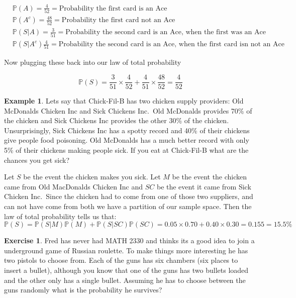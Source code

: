 \documentclass[
]{book}
\newcommand{\prob}[1]{{\mathbb{P}(#1)}}
\theoremstyle{definition}
\theoremstyle{definition}
\newtheorem{example}{Example}[chapter]
\theoremstyle{definition}
\newtheorem{exercise}{Exercise}[chapter]
\theoremstyle{definition}
\theoremstyle{remark}
\begin{document}
\[
 \begin{aligned}
 &\prob{A}=\frac{4}{52}=\text{Probability the first card is an Ace}  \\
 &\prob{A^c}=\frac{48}{52}=\text{Probability the first card not an Ace}    \\
 &\prob{S|A}=\frac{3}{51}=\text{Probability the second card is an Ace, when the first was an Ace}    \\
 &\prob{S|A^c}\frac{4}{51}=\text{Probability the second card is an Ace, when the first card isn not an Ace}   
 \end{aligned}
\]

Now plugging these back into our law of total probability

\[\prob{S}=\frac{3}{51}\times \frac{4}{52} + \frac{4}{51}\times \frac{48}{52} =\frac{4}{52} \]

\begin{example}
\protect\hypertarget{exm:unnamed-chunk-247}{}\label{exm:unnamed-chunk-247}Lets say that Chick-Fil-B has two chicken supply providers: Old McDonalds Chicken Inc and Sick Chickens Inc.~Old McDonalds provides 70\% of the chicken and Sick Chickens Inc provides the other 30\% of the chicken. Unsurprisingly, Sick Chickens Inc has a spotty record and 40\% of their chickens give people food poisoning. Old McDonalds has a much better record with only 5\% of their chickens making people sick. If you eat at Chick-Fil-B what are the chances you get sick?
\end{example}

Let \(S\) be the event the chicken makes you sick. Let \(M\) be the event the chicken came from Old MacDonalds Chicken Inc and \(SC\) be the event it came from Sick Chicken Inc.~Since the chicken had to come from one of those two suppliers, and can not have come from both we have a partition of our sample space. Then the law of total probability tells us that:
\[ \prob{S}=\prob{S|M}\prob{M}+\prob{S|SC}\prob{SC}=0.05 \times 0.70 + 0.40 \times 0.30=0.155=15.5\% \]

\begin{exercise}
\protect\hypertarget{exr:unnamed-chunk-248}{}\label{exr:unnamed-chunk-248}Fred has never had MATH 2330 and thinks its a good idea to join a underground game of Russian roulette. To make things more interesting he has two pistols to choose from. Each of the guns has six chambers (six places to insert a bullet), although you know that one of the guns has two bullets loaded and the other only has a single bullet. Assuming he has to choose between the guns randomly what is the probability he survives?
\end{exercise}
\end{document}
